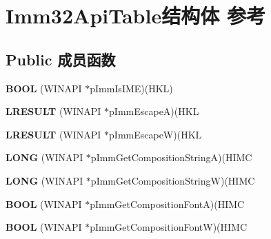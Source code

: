 \hypertarget{struct_imm32_api_table}{}\section{Imm32\+Api\+Table结构体 参考}
\label{struct_imm32_api_table}
\subsection*{Public 成员函数}
\begin{DoxyCompactItemize}
\item 
\mbox{\label{struct_imm32_api_table_a5a6a8c265abc28b99283d605af6a5452}} 
{\bfseries B\+O\+OL} (W\+I\+N\+A\+PI $\ast$p\+Imm\+Is\+I\+ME)(H\+KL)
\item 
\mbox{\label{struct_imm32_api_table_a565cc9a993f8f896353003b9194cc9bf}} 
{\bfseries L\+R\+E\+S\+U\+LT} (W\+I\+N\+A\+PI $\ast$p\+Imm\+EscapeA)(H\+KL
\item 
\mbox{\label{struct_imm32_api_table_a47de1dd65f60aaf78a82625b87913123}} 
{\bfseries L\+R\+E\+S\+U\+LT} (W\+I\+N\+A\+PI $\ast$p\+Imm\+EscapeW)(H\+KL
\item 
\mbox{\label{struct_imm32_api_table_a1e121ec880d62ab5eca36449614af09c}} 
{\bfseries L\+O\+NG} (W\+I\+N\+A\+PI $\ast$p\+Imm\+Get\+Composition\+StringA)(H\+I\+MC
\item 
\mbox{\label{struct_imm32_api_table_a6cfb98a10bcfeb8a386022f9654ca063}} 
{\bfseries L\+O\+NG} (W\+I\+N\+A\+PI $\ast$p\+Imm\+Get\+Composition\+StringW)(H\+I\+MC
\item 
\mbox{\label{struct_imm32_api_table_a10576d70ab9b0a3b73c64ab1c31e0713}} 
{\bfseries B\+O\+OL} (W\+I\+N\+A\+PI $\ast$p\+Imm\+Get\+Composition\+FontA)(H\+I\+MC
\item 
\mbox{\label{struct_imm32_api_table_abfdcab028ac8ce6ceeb79e4eaaa3bcff}} 
{\bfseries B\+O\+OL} (W\+I\+N\+A\+PI $\ast$p\+Imm\+Get\+Composition\+FontW)(H\+I\+MC
\item 
\mbox{\label{struct_imm32_api_table_a0f4adcd83e3d21d1e0f831d685010d41}} 

\end{DoxyCompactItemize}
